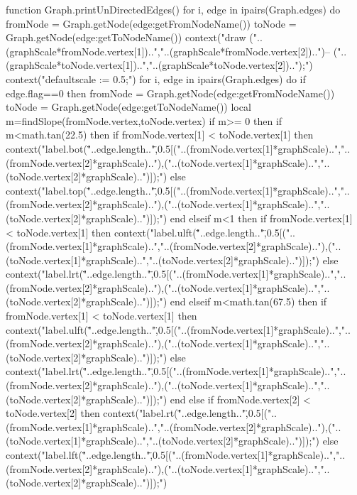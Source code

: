 function Graph.printUnDirectedEdges()
	for i, edge in ipairs(Graph.edges) do
		fromNode = Graph.getNode(edge:getFromNodeName())
		toNode = Graph.getNode(edge:getToNodeName())
		context("draw ("..(graphScale*fromNode.vertex[1])..","..(graphScale*fromNode.vertex[2])..")-- ("..(graphScale*toNode.vertex[1])..","..(graphScale*toNode.vertex[2])..");")
		context("defaultscale := 0.5;")
	for i, edge in ipairs(Graph.edges) do
		if edge.flag==0 then
			fromNode = Graph.getNode(edge:getFromNodeName())
			toNode = Graph.getNode(edge:getToNodeName())
			local m=findSlope(fromNode.vertex,toNode.vertex)
			if m>= 0 then
				if m<math.tan(22.5) then
					if fromNode.vertex[1] < toNode.vertex[1] then
						context("label.bot(\""..edge.length.."\",0.5[("..(fromNode.vertex[1]*graphScale)..","..(fromNode.vertex[2]*graphScale).."),("..(toNode.vertex[1]*graphScale)..","..(toNode.vertex[2]*graphScale)..")]);")
					else
						context("label.top(\""..edge.length.."\",0.5[("..(fromNode.vertex[1]*graphScale)..","..(fromNode.vertex[2]*graphScale).."),("..(toNode.vertex[1]*graphScale)..","..(toNode.vertex[2]*graphScale)..")]);")
					end
				elseif m<1 then
					if fromNode.vertex[1] < toNode.vertex[1] then
						context("label.ulft(\""..edge.length.."\",0.5[("..(fromNode.vertex[1]*graphScale)..","..(fromNode.vertex[2]*graphScale).."),("..(toNode.vertex[1]*graphScale)..","..(toNode.vertex[2]*graphScale)..")]);")
					else
						context("label.lrt(\""..edge.length.."\",0.5[("..(fromNode.vertex[1]*graphScale)..","..(fromNode.vertex[2]*graphScale).."),("..(toNode.vertex[1]*graphScale)..","..(toNode.vertex[2]*graphScale)..")]);")
					end
				elseif m<math.tan(67.5) then
					if fromNode.vertex[1] < toNode.vertex[1] then
						context("label.ulft(\""..edge.length.."\",0.5[("..(fromNode.vertex[1]*graphScale)..","..(fromNode.vertex[2]*graphScale).."),("..(toNode.vertex[1]*graphScale)..","..(toNode.vertex[2]*graphScale)..")]);")
					else
						context("label.lrt(\""..edge.length.."\",0.5[("..(fromNode.vertex[1]*graphScale)..","..(fromNode.vertex[2]*graphScale).."),("..(toNode.vertex[1]*graphScale)..","..(toNode.vertex[2]*graphScale)..")]);")
					end
				else
					if fromNode.vertex[2] < toNode.vertex[2] then
						context("label.rt(\""..edge.length.."\",0.5[("..(fromNode.vertex[1]*graphScale)..","..(fromNode.vertex[2]*graphScale).."),("..(toNode.vertex[1]*graphScale)..","..(toNode.vertex[2]*graphScale)..")]);")
					else
						context("label.lft(\""..edge.length.."\",0.5[("..(fromNode.vertex[1]*graphScale)..","..(fromNode.vertex[2]*graphScale).."),("..(toNode.vertex[1]*graphScale)..","..(toNode.vertex[2]*graphScale)..")]);")
